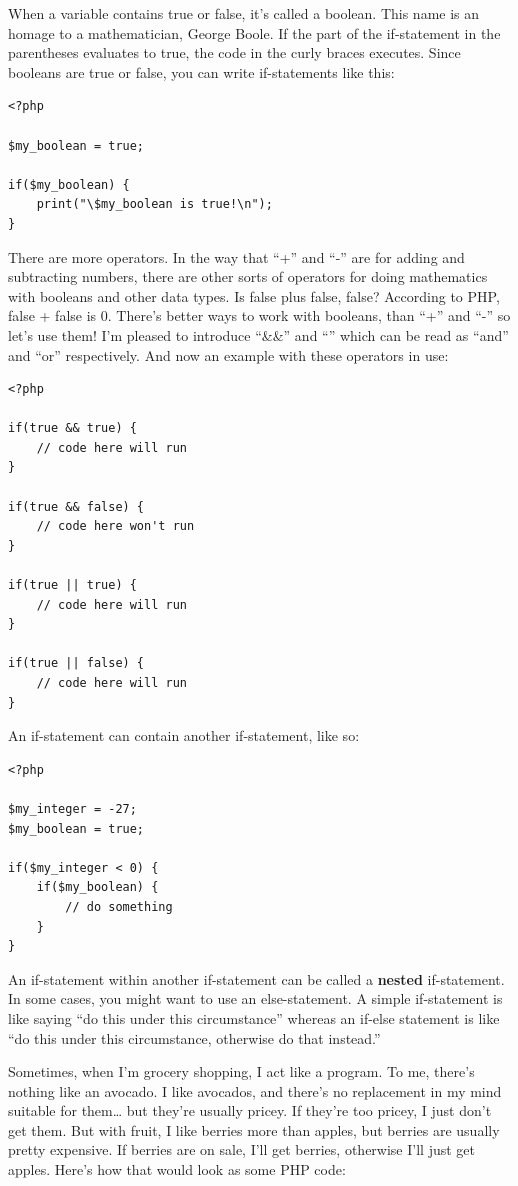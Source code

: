 \documentclass[
]{book}
\begin{document}
When a variable contains true or false, it's called a boolean. This name is an homage to a mathematician, George Boole. If the part of the if-statement in the parentheses evaluates to true, the code in the curly braces executes. Since booleans are true or false, you can write if-statements like this:

\begin{verbatim}
<?php 

$my_boolean = true;

if($my_boolean) {
    print("\$my_boolean is true!\n");
}
\end{verbatim}

There are more operators. In the way that ``+'' and ``-'' are for adding and subtracting numbers, there are other sorts of operators for doing mathematics with booleans and other data types. Is false plus false, false? According to PHP, false + false is 0. There's better ways to work with booleans, than ``+'' and ``-'' so let's use them! I'm pleased to introduce ``\&\&'' and ``\textbar\textbar{}'' which can be read as ``and'' and ``or'' respectively. And now an example with these operators in use:

\begin{verbatim}
<?php 

if(true && true) {
    // code here will run
}

if(true && false) {
    // code here won't run
}

if(true || true) {
    // code here will run
}

if(true || false) {
    // code here will run
}
\end{verbatim}

An if-statement can contain another if-statement, like so:

\begin{verbatim}
<?php 

$my_integer = -27;
$my_boolean = true;

if($my_integer < 0) {
    if($my_boolean) {
        // do something
    } 
}
\end{verbatim}

An if-statement within another if-statement can be called a \textbf{nested} if-statement. In some cases, you might want to use an else-statement. A simple if-statement is like saying ``do this under this circumstance'' whereas an if-else statement is like ``do this under this circumstance, otherwise do that instead.''

Sometimes, when I'm grocery shopping, I act like a program. To me, there's nothing like an avocado. I like avocados, and there's no replacement in my mind suitable for them\ldots{} but they're usually pricey. If they're too pricey, I just don't get them. But with fruit, I like berries more than apples, but berries are usually pretty expensive. If berries are on sale, I'll get berries, otherwise I'll just get apples. Here's how that would look as some PHP code:
\end{document}
